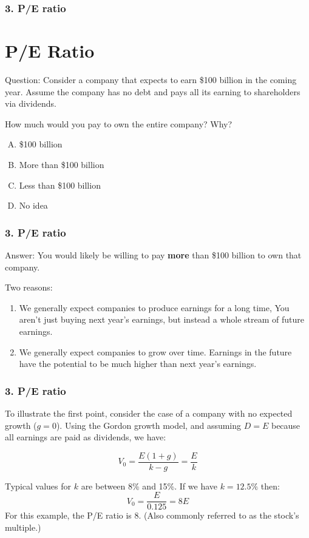 \documentclass{beamer}
\begin{document}
\begin{frame}[t]
    \frametitle{3. P/E ratio}
    \section{P/E Ratio}

    Question: Consider a company that expects to earn \$100 billion in the coming year. Assume the company has no debt and pays all its earning to shareholders via dividends.
    
    \vspace{1em}
    How much would you pay to own the entire company? Why?
    \begin{enumerate}[(A)]
        \item \$100 billion
        \item More than \$100 billion
        \item Less than \$100 billion
        \item No idea
    \end{enumerate}
    \vspace{1em}

\end{frame}

\begin{frame}[t]
    \frametitle{3. P/E ratio}

    Answer: You would likely be willing to pay \textbf{more} than \$100 billion to own that company.

    \vspace{1em}
    Two reasons:
    \begin{enumerate}
        \item We generally expect companies to produce earnings for a long time,   You aren't just buying next year's earnings, but instead a whole stream of future earnings.
        \item We generally expect companies to grow over time.   Earnings in the future have the potential to be much higher than next year's earnings.
    \end{enumerate}

\end{frame}

\begin{frame}[t]
    \frametitle{3. P/E ratio}
    \subtitle{Value of company with no growth}

    To illustrate the first point, consider the case of a company with no expected growth ($g=0$).   Using the Gordon growth model, and assuming $D=E$ because all earnings are paid as dividends, we have:

    $$V_0 = \frac{E(1+g)}{k-g} = \frac{E}{k}$$

    \vspace{1em}
    Typical values for $k$ are between 8\% and 15\%.   If we have $k=12.5\%$ then:
    $$V_0 = \frac{E}{0.125} = 8E$$
    For this example, the P/E ratio is 8.   (Also commonly referred to as the stock's multiple.)    

\end{frame}
\end{document}
